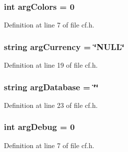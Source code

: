 \subsubsection[{\texorpdfstring{arg\+Colors}{argColors}}]{\setlength{\rightskip}{0pt plus 5cm}int arg\+Colors = 0}\hypertarget{class_k_1_1_c_f_a4a280cd3b15e44c13dd04b093185f3d4}{}\label{class_k_1_1_c_f_a4a280cd3b15e44c13dd04b093185f3d4}


Definition at line 7 of file cf.\+h.

\subsubsection[{\texorpdfstring{arg\+Currency}{argCurrency}}]{\setlength{\rightskip}{0pt plus 5cm}string arg\+Currency = \char`\"{}N\+U\+LL\char`\"{}}\hypertarget{class_k_1_1_c_f_a8c9947131171d2d20bc1ea5b3423a395}{}\label{class_k_1_1_c_f_a8c9947131171d2d20bc1ea5b3423a395}


Definition at line 19 of file cf.\+h.

\subsubsection[{\texorpdfstring{arg\+Database}{argDatabase}}]{\setlength{\rightskip}{0pt plus 5cm}string arg\+Database = \char`\"{}\char`\"{}}\hypertarget{class_k_1_1_c_f_a1554afb0c30eb312e1b19b476b9bed36}{}\label{class_k_1_1_c_f_a1554afb0c30eb312e1b19b476b9bed36}


Definition at line 23 of file cf.\+h.

\subsubsection[{\texorpdfstring{arg\+Debug}{argDebug}}]{\setlength{\rightskip}{0pt plus 5cm}int arg\+Debug = 0}\hypertarget{class_k_1_1_c_f_adf3bd2e6fb3d053f4fbeb11b358355e7}{}\label{class_k_1_1_c_f_adf3bd2e6fb3d053f4fbeb11b358355e7}


Definition at line 7 of file cf.\+h.

